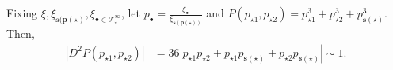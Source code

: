 \documentclass[%
11pt,  reqno]{amsart}
\newcommand{\5}{\textup{V}}
\newcommand{\ind}{\mathbbm 1}
\newcommand{\les}{\lesssim}
\newcommand{\wt}{\widetilde}
\theoremstyle{remark}
\newcommand{\bul}{\bullet}
\newcommand{\TT}{\mathcal{T}}
\newcommand{\al}{\alpha}
\newcommand{\pb}{\mathbf{p}}
\newcommand{\sbf}{\mathbf{s}}
\newcommand{\jb}[1]
{\langle #1 \rangle}
\numberwithin{equation}{section}
\numberwithin{theorem}{section}
\begin{document}
% 
% 
% 
Fixing $\xi, \xi_{\sbf(\pb(\star)}, \xi_{\bul\in\TT^\infty_\star}$, let $p_\bul = \frac{\xi_\bul}{\xi_{\sbf(\pb(\star))}}$ and $P(p_{\star1}, p_{\star2}) = p^3_{\star1} + p^3_{\star2} + p_{\sbf(\star)}^3$. Then, 
\begin{align}
    | D^2 P(p_{\star1}, p_{\star2}) | 
    &
    = 36 |p_{\star1} p_{\star2} + p_{\star1} p_{\sbf(\star)} + p_{\star2} p_{\sbf(\star)} | 
    \sim 1  .
\end{align}
\end{document}
